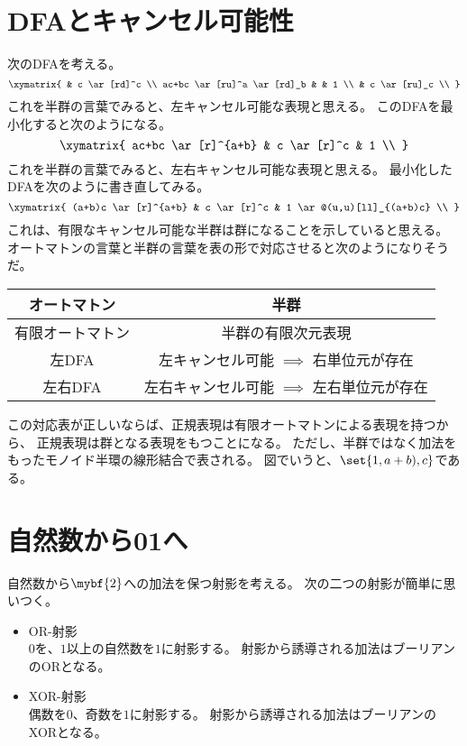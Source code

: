 \section{DFAとキャンセル可能性}\label{s1:DFAとキャンセル可能性} %
	次のDFAを考える。
	\begin{equation}\xymatrix{
		& c \ar[rd]^c \\
		ac+bc \ar[ru]^a \ar[rd]_b & & 1 \\
		& c \ar[ru]_c \\
	}\end{equation}
	これを半群の言葉でみると、左キャンセル可能な表現と思える。
	このDFAを最小化すると次のようになる。
	\begin{equation}\xymatrix{
		ac+bc \ar[r]^{a+b} & c \ar[r]^c & 1 \\
	}\end{equation}
	これを半群の言葉でみると、左右キャンセル可能な表現と思える。
	最小化したDFAを次のように書き直してみる。
	\begin{equation}\xymatrix{
		(a+b)c \ar[r]^{a+b} & c \ar[r]^c & 1 \ar@(u,u)[ll]_{(a+b)c} \\
	}\end{equation}
	これは、有限なキャンセル可能な半群は群になることを示していると思える。
	オートマトンの言葉と半群の言葉を表の形で対応させると次のようになりそうだ。
	\begin{tabular}{cc}
		オートマトン & 半群 \\ \hline
		有限オートマトン & 半群の有限次元表現 \\
		左DFA & 左キャンセル可能 $\implies$ 右単位元が存在 \\
		左右DFA & 左右キャンセル可能 $\implies$ 左右単位元が存在 \\ \hline
	\end{tabular}

	この対応表が正しいならば、正規表現は有限オートマトンによる表現を持つから、
	正規表現は群となる表現をもつことになる。
	ただし、半群ではなく加法をもったモノイド半環の線形結合で表される。
	図でいうと、$\set{1,a+b),c}$である。

\section{自然数から01へ}\label{s1:自然数から01へ} %
	自然数から$\mybf{2}$への加法を保つ射影を考える。
	次の二つの射影が簡単に思いつく。
	\begin{itemize}
		\item OR-射影 \\
		$0$を、$1$以上の自然数を$1$に射影する。
		射影から誘導される加法はブーリアンのORとなる。
		\item XOR-射影 \\
		偶数を$0$、奇数を$1$に射影する。
		射影から誘導される加法はブーリアンのXORとなる。
	\end{itemize}

